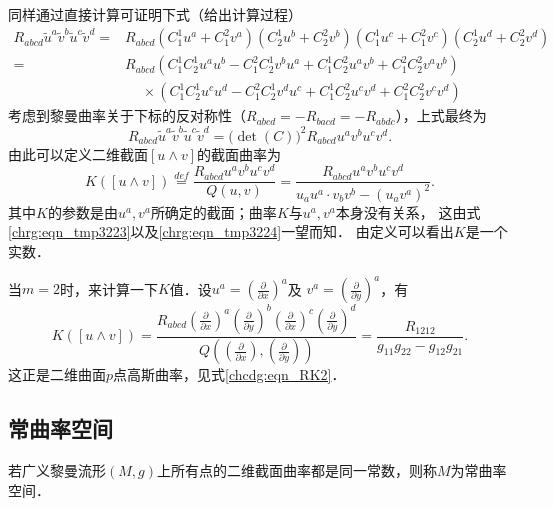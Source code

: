 同样通过直接计算可证明下式（给出计算过程）
\begin{align*}
    R_{abcd}\tilde{u}^a\tilde{v}^b\tilde{u}^c\tilde{v}^d = & R_{abcd}
    (C_1^1 u^a +C_1^2 v^a) (C_2^1 u^b +C_2^2 v^b)(C_1^1 u^c +C_1^2 v^c) (C_2^1 u^d +C_2^2 v^d) \\
    =&R_{abcd}(C_1^1 C_2^1 u^a u^b -C_1^2 C_2^1 v^b u^a+ C_1^1 C_2^2 u^a v^b +C_1^2 C_2^2 v^a v^b) \\
    &\phantom{R_{a}}\times (C_1^1 C_2^1 u^c u^d -C_1^2 C_2^1 v^d u^c+ C_1^1 C_2^2 u^c v^d +C_1^2 C_2^2 v^c v^d)
\end{align*}
考虑到黎曼曲率关于下标的反对称性（$R_{abcd}=-R_{bacd}=-R_{abdc}$），上式最终为
\begin{equation}\label{chrg:eqn_tmp3224}
    R_{abcd}\tilde{u}^a\tilde{v}^b\tilde{u}^c\tilde{v}^d = \bigl(\det(C)\bigr)^2 R_{abcd} u^a v^b u^c v^d .
\end{equation}
由此可以定义二维截面$[u\wedge v]$的{\heiti 截面曲率}为
\begin{equation}\label{chrg:eqn_sectional-curvature}
    K([u\wedge v]) \overset{def}{=}  \frac{R_{abcd} u^a v^b u^c v^d}{Q(u,v)} 
    = \frac{R_{abcd} u^a v^b u^c v^d}{{u}_a{u}^a \cdot {v}_b{v}^b - ({u}_a{v}^a)^2 } .
\end{equation}
其中$K$的参数是由$u^a,v^a$所确定的截面；曲率$K$与$u^a,v^a$本身没有关系，
这由式\eqref{chrg:eqn_tmp3223}以及\eqref{chrg:eqn_tmp3224}一望而知．
由定义可以看出$K$是一个实数．

\begin{example}\label{chrg:exam_sc-gauss}
    当$m=2$时，来计算一下$K$值．设$u^a=(\frac{\partial}{\partial x})^a$及
    $v^a=(\frac{\partial}{\partial y})^a$，有
    \begin{equation}
        K([u\wedge v]) = \frac{R_{abcd} (\frac{\partial}{\partial x})^a (\frac{\partial}{\partial y})^b
            (\frac{\partial}{\partial x})^c (\frac{\partial}{\partial y})^d}
          {Q((\frac{\partial}{\partial x}),(\frac{\partial}{\partial y}))}
        =\frac{R_{1212}}{g_{11}g_{22}-g_{12}g_{21}} .
    \end{equation}
    这正是二维曲面$p$点高斯曲率，见式\eqref{chcdg:eqn_RK2}．
\end{example}


\subsection{常曲率空间}\label{chrg:sec_const-curvature}
\begin{definition}
        若广义黎曼流形$(M,g)$上所有点的二维截面曲率都是同一常数，则称$M$为{\heiti 常曲率空间}．
\end{definition}

